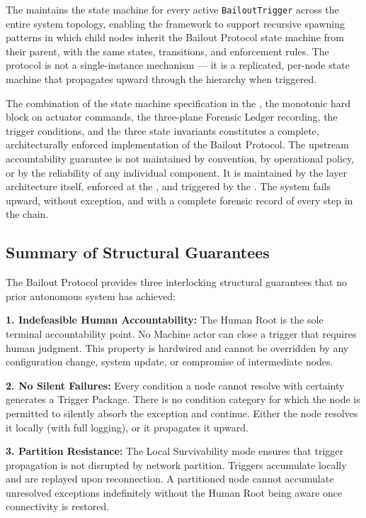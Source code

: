 The \fact{} maintains the state machine for every active \texttt{BailoutTrigger} across the entire system topology, enabling the framework to support recursive spawning patterns in which child nodes inherit the Bailout Protocol state machine from their parent, with the same states, transitions, and enforcement rules. The protocol is not a single-instance mechanism — it is a replicated, per-node state machine that propagates upward through the hierarchy when triggered.

The combination of the state machine specification in the \fact{}, the monotonic hard block on actuator commands, the three-plane Forensic Ledger recording, the \bounds{} trigger conditions, and the three state invariants constitutes a complete, architecturally enforced implementation of the Bailout Protocol. The upstream accountability guarantee is not maintained by convention, by operational policy, or by the reliability of any individual component. It is maintained by the layer architecture itself, enforced at the \fact{}, and triggered by the \bounds{}. The system fails upward, without exception, and with a complete forensic record of every step in the chain.

\subsection{Summary of Structural Guarantees}

The Bailout Protocol provides three interlocking structural guarantees that no prior autonomous system has achieved:

\medskip
\noindent\textbf{1. Indefeasible Human Accountability:} The Human Root is the sole terminal accountability point. No Machine actor can close a trigger that requires human judgment. This property is hardwired and cannot be overridden by any configuration change, system update, or compromise of intermediate nodes.

\medskip
\noindent\textbf{2. No Silent Failures:} Every condition a node cannot resolve with certainty generates a Trigger Package. There is no condition category for which the node is permitted to silently absorb the exception and continue. Either the node resolves it locally (with full logging), or it propagates it upward.

\medskip
\noindent\textbf{3. Partition Resistance:} The Local Survivability mode ensures that trigger propagation is not disrupted by network partition. Triggers accumulate locally and are replayed upon reconnection. A partitioned node cannot accumulate unresolved exceptions indefinitely without the Human Root being aware once connectivity is restored.

